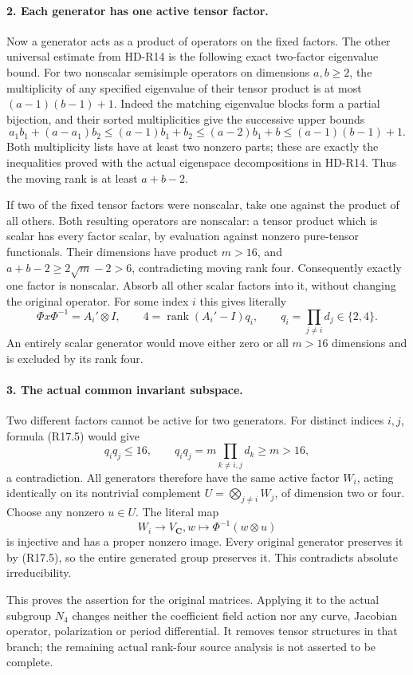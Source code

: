\paragraph{2. Each generator has one active tensor factor.}
Now a generator acts as a product of operators on the fixed
factors. The other universal estimate from HD-R14 is the
following exact two-factor eigenvalue bound. For two
nonscalar semisimple operators on dimensions \(a,b\ge2\),
the multiplicity of any specified eigenvalue of their tensor
product is at most
\((a-1)(b-1)+1\). Indeed the matching eigenvalue blocks
form a partial bijection, and their sorted multiplicities
give the successive upper bounds
\[
 a_1b_1+(a-a_1)b_2
 \le(a-1)b_1+b_2
 \le(a-2)b_1+b
 \le(a-1)(b-1)+1.                                      \tag{R17.4}
\]
Both multiplicity lists have at least two nonzero parts;
these are exactly the inequalities proved with the actual
eigenspace decompositions in HD-R14. Thus the moving rank
is at least \(a+b-2\).

If two of the fixed tensor factors were nonscalar, take
one against the product of all others. Both resulting
operators are nonscalar: a tensor product which is scalar
has every factor scalar, by evaluation against nonzero
pure-tensor functionals. Their dimensions have product
\(m>16\), and
\(a+b-2\ge2\sqrt m-2>6\), contradicting moving rank four.
Consequently exactly one factor is nonscalar. Absorb all
other scalar factors into it, without changing the original
operator. For some index \(i\) this gives literally
\[
             \Phi x\Phi^{-1}=A_i'\otimes I,
 \qquad4=\operatorname{rank}(A_i'-I)q_i,
 \qquad q_i=\prod_{j\ne i}d_j\in\{2,4\}.              \tag{R17.5}
\]
An entirely scalar generator would move either zero or
all \(m>16\) dimensions and is excluded by its rank four.

\paragraph{3. The actual common invariant subspace.}
Two different factors cannot be active for two generators.
For distinct indices \(i,j\), formula (R17.5) would give
\[
 q_iq_j\le16,
 \qquad q_iq_j=m\prod_{k\ne i,j}d_k\ge m>16,            \tag{R17.6}
\]
a contradiction. All generators therefore have the same
active factor \(W_i\), acting identically on its nontrivial
complement \(U=\bigotimes_{j\ne i}W_j\), of dimension
two or four. Choose any nonzero \(u\in U\). The literal map
\[
            W_i\longrightarrow V_{\mathbf C},
                  w\longmapsto\Phi^{-1}(w\otimes u)      \tag{R17.7}
\]
is injective and has a proper nonzero image. Every original
generator preserves it by (R17.5), so the entire generated
group preserves it. This contradicts absolute irreducibility.

This proves the assertion for the original matrices. Applying
it to the actual subgroup \(N_4\) changes neither the
coefficient field action nor any curve, Jacobian operator,
polarization or period differential. It removes tensor
structures in that branch; the remaining actual rank-four
source analysis is not asserted to be complete.
